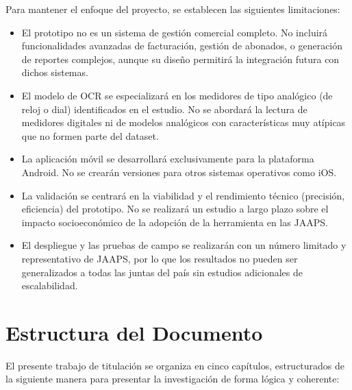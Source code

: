 Para mantener el enfoque del proyecto, se establecen las siguientes limitaciones:
\begin{itemize}
\item El prototipo no es un sistema de gestión comercial completo. No incluirá funcionalidades avanzadas de facturación, gestión de abonados, o generación de reportes complejos, aunque su diseño permitirá la integración futura con dichos sistemas.
\item El modelo de OCR se especializará en los medidores de tipo analógico (de reloj o dial) identificados en el estudio. No se abordará la lectura de medidores digitales ni de modelos analógicos con características muy atípicas que no formen parte del dataset.
\item La aplicación móvil se desarrollará exclusivamente para la plataforma Android. No se crearán versiones para otros sistemas operativos como iOS.
\item La validación se centrará en la viabilidad y el rendimiento técnico (precisión, eficiencia) del prototipo. No se realizará un estudio a largo plazo sobre el impacto socioeconómico de la adopción de la herramienta en las JAAPS.
\item El despliegue y las pruebas de campo se realizarán con un número limitado y representativo de JAAPS, por lo que los resultados no pueden ser generalizados a todas las juntas del país sin estudios adicionales de escalabilidad.
\end{itemize}

\section{Estructura del Documento}
\label{sec:structure}

El presente trabajo de titulación se organiza en cinco capítulos, estructurados de la siguiente manera para presentar la investigación de forma lógica y coherente:

